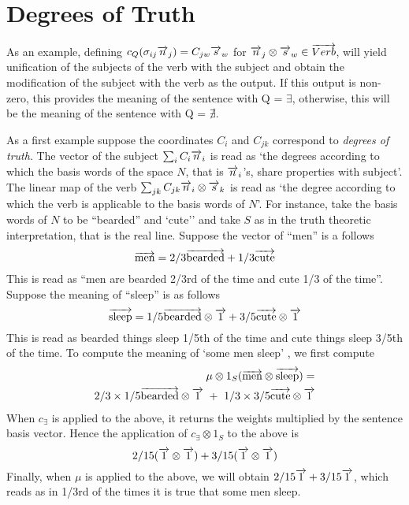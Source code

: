 \section{Degrees of Truth}

As an example, defining  $c_Q(\sigma_{ij} \overrightarrow{n}_j) =  C_{jw}\overrightarrow{s}_w$ for $\overrightarrow{n}_j \otimes \overrightarrow{s}_w \in \overrightarrow{Verb}$, will yield unification of  the subjects of the verb with the subject and obtain the modification of the subject with the verb as the output. If this output is non-zero, this provides the meaning of the sentence with Q = $\exists$, otherwise, this will be the meaning of the sentence  with Q = $\nexists$. 

As a first example suppose the coordinates $C_i$ and $C_{jk}$ correspond to \emph{degrees of truth}. The vector of the subject $\sum_i C_i \overrightarrow{n}_i$ is read as `the degrees according to which the basis words of the space $N$, that is   $\overrightarrow{n}_i$'s,  share properties with subject'.  The linear map of the verb $\sum_{jk} C_{jk} \overrightarrow{n}_i \otimes \overrightarrow{s}_k$ is read as `the degree according to which the verb is applicable to  the basis words of $N$'. For instance, take the basis words of $N$ to be ``bearded'' and `cute'' and take $S$ as in the truth theoretic interpretation, that is the real line.  Suppose the vector of ``men'' is a follows
\[
\overrightarrow{\text{men}} = 2/3 \overrightarrow{\text{bearded}} + 1/3 \overrightarrow{\text{cute}}
\]
This is read as ``men are  bearded 2/3rd of the time and cute 1/3 of the time''. Suppose the meaning of ``sleep'' is as follows
\[
\overrightarrow{\text{sleep}} = 1/5 \overrightarrow{\text{bearded}} \otimes \overrightarrow{1}  + 3/5 \overrightarrow{\text{cute}} \otimes \overrightarrow{1}
\]
This is read as bearded things sleep 1/5th of the time  and cute things sleep 3/5th of the time. To compute the meaning of `some men sleep' , we first compute
\begin{align*}
\mu \otimes 1_S (\ov{\text{men}} \otimes \ov{\text{sleep}}) = &\\
2/3 \times 1/5 \ov{\text{bearded}} \otimes \ov{1} \ + \ 
1/3\times 3/5\ov{\text{cute}} \otimes \ov{1}&
\end{align*}
When $c_{\exists}$ is applied to the above, it returns the weights multiplied by the sentence basis vector. Hence the application of $c_{\exists} \otimes 1_S$ to the above  is 
\[
2/15 (\overrightarrow{1} \otimes \overrightarrow{1})+ 3/15 (\overrightarrow{1} \otimes \overrightarrow{1})
\]
Finally, when $\mu$ is applied to the above, we will obtain  $2/15 \overrightarrow{1} + 3/15 \overrightarrow{1}$, which reads as in 1/3rd of the times it is true that some men sleep. 

